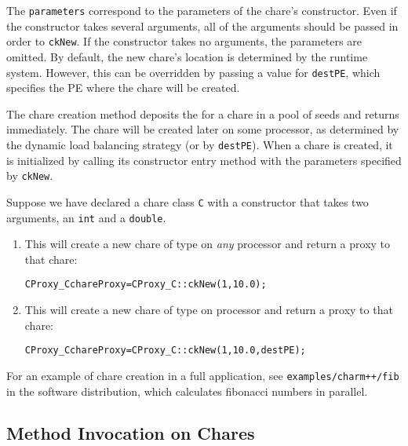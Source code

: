 The {\tt parameters} correspond to the parameters of the chare's constructor.
Even if the constructor takes several arguments, all of the arguments should be
passed in order to {\tt ckNew}. If the constructor takes no arguments, the
parameters are omitted. By default, the new chare's location is determined by
the runtime system. However, this can be overridden by passing a value for
{\tt destPE}, which specifies the PE where the chare will be created.

The chare creation method deposits the  for
a chare in a pool of seeds and returns immediately. The chare will
be created later on some processor, as determined by the dynamic load balancing strategy (or by {\tt destPE}).
When a chare is created, it is
initialized by calling its constructor entry method with the parameters specified by {\tt ckNew}.

Suppose we have declared a chare class {\tt C} with a constructor that takes two
arguments, an {\tt int} and a {\tt double}.

\begin{enumerate}
\item{This will create a new chare of type  on {\em any}
processor and return a proxy to that chare:}

\begin{alltt}
   CProxy_C chareProxy = CProxy_C::ckNew(1, 10.0);
\end{alltt} 

\item{This will create a new chare of type  on processor
 and return a proxy to that chare:}

\begin{alltt}
   CProxy_C chareProxy = CProxy_C::ckNew(1, 10.0, destPE);
\end{alltt}

\end{enumerate}

For an example of chare creation in a full application, see
{\tt examples/charm++/fib} in the \charmpp software distribution, which
calculates fibonacci numbers in parallel.

\subsection{Method Invocation on Chares}

